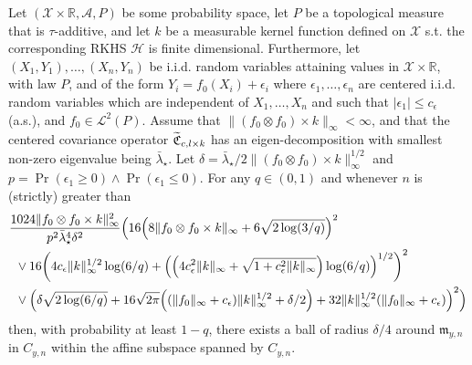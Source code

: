 \documentclass[10pt]{amsart}
\theoremstyle{definition}\newtheorem{defi}[theo]{Definition}\newtheorem{rema}[theo]{Remark}\newtheorem{exam}[theo]{Example}\newtheorem{exem}[theo]{Example}\newtheorem{nota}[theo]{Notation}
\theoremstyle{remark}
\newcommand{\R}{\mathbb{R}}
\newcommand{\X}{\mathcal{X}}
\newcommand{\clA}{\mathcal{A}}
\newcommand{\cH}{\mathcal{H}}
\newcommand{\clL}{\mathcal{L}}
\newcommand{\fkC}{\mathfrak{C}}
\newcommand{\mean}{\mathfrak{m}}
\let\oldtilde\tilde
\renewcommand*{\tilde}[1]{\mathchoice{\widetilde{#1}}{\widetilde{#1}}{\oldtilde{#1}}{\oldtilde{#1}}}
\let\originalleft\left
\let\originalright\right
\renewcommand{\left}{\mathopen{}\mathclose\bgroup\originalleft}
\renewcommand{\right}{\aftergroup\egroup\originalright}
\begin{document}
\begin{prop}\label{prop:bnd_Y}
Let $(\X \times \R,\clA,P)$ be some probability space, let $P$ be a topological measure that is $\tau$-additive, and let $k$ be a measurable kernel function defined on $\X$ s.t. the corresponding RKHS $\cH$ is finite dimensional. Furthermore, let $(X_1,Y_1),\dots, (X_n,Y_n)$ be i.i.d. random variables attaining values in $\X \times \R$, with law $P$, and of the form $Y_i = f_0(X_i) + \epsilon_i$ where $\epsilon_1,\dots, \epsilon_n$ are centered i.i.d. random variables which are independent of $X_1,\dots, X_n$ and such that $|\epsilon_1| \leq c_\epsilon$ (a.s.), and $f_0 \in \clL^2(P)$. Assume that $\|(f_0 \otimes f_0) \times k\|_\infty < \infty$, and that the centered covariance operator $\tilde{\fkC}_{c,l \times k}$ has an eigen-decomposition with smallest non-zero eigenvalue being $\bar \lambda_\star$. Let $\delta = \bar \lambda_\star/2 \|(f_0 \otimes f_0) \times k\|_\infty^{1/2}$ and $p = \Pr(\epsilon_1 \geq 0) \wedge \Pr(\epsilon_1 \leq 0)$. For any $q \in (0,1)$ and whenever $n$ is (strictly) greater than
\begin{align*}
&\frac{1024 \|f_0 \otimes f_0 \times k\|^2_\infty}{p^2 \bar \lambda_\star^4 \delta^2}
\Bigl(16 \left(8 \|f_0 \otimes f_0 \times k\|_\infty + 6\sqrt{2\log(3/q)}\right)^2 \\
&\enspace \vee 16 \left(4 c_\epsilon \|k\|^{1/2}_\infty \log(6/q) + \left(\left(4c^2_\epsilon \|k\|_\infty + \sqrt{1+c^2_\epsilon \|k\|_\infty}\right)\log(6/q)\right)^{1/2}\right)^2 \\
&\enspace \vee \left(\delta \sqrt{2\log(6/q)} + 16 \sqrt{2\pi} \left((\|f_0\|_\infty + c_\epsilon) \|k\|_\infty^{1/2} +\delta/2\right) + 32 \|k\|_\infty^{1/2} (\|f_0\|_\infty + c_\epsilon)\right)^2
\Bigr)
\end{align*}
then, with probability at least $1-q$, there exists a ball of radius $\delta/4$ around $\mean_{y,n}$\linebreak in $C_{y,n}$ within the affine subspace spanned by $C_{y,n}$.
\end{prop}
\end{document}

